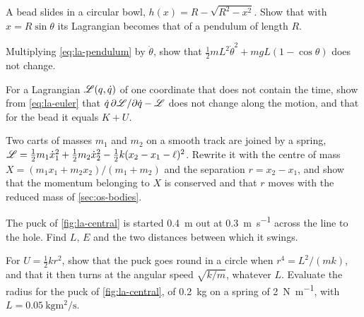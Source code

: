 \begin{exercise}
\label{ex:la-bowl}
A bead slides in a circular bowl, $h(x) = R - \sqrt{R^2 - x^2}$. Show
that with $x = R\sin\theta$ its Lagrangian becomes that of a pendulum of
length $R$.
\end{exercise}

\begin{exercise}
\label{ex:la-energy}
Multiplying \cref{eq:la-pendulum} by $\dot\theta$, show that $\frac12
mL^2\dot\theta^2 + mgL(1 - \cos\theta)$ does not change.
\end{exercise}

\begin{exercise}
\label{ex:la-hamilton}
For a Lagrangian $\mathscr{L}(q, \dot{q})$ of one coordinate that does not
contain the time, show from \cref{eq:la-euler} that $\dot{q}\,\partial
\mathscr{L}/\partial\dot{q} - \mathscr{L}$ does not change along the motion, and that
for the bead it equals $K + U$.
\end{exercise}

\begin{exercise}
\label{ex:la-carts}
Two carts of masses $m_1$ and $m_2$ on a smooth track are joined by a
spring, $\mathscr{L} = \frac12 m_1\dot{x}_1^2 + \frac12 m_2\dot{x}_2^2 - \frac12
k(x_2 - x_1 - \ell)^2$. Rewrite it with the centre of mass $X = (m_1x_1 +
m_2x_2)/(m_1 + m_2)$ and the separation $r = x_2 - x_1$, and show that
the momentum belonging to $X$ is conserved and that $r$ moves with the
reduced mass of \cref{sec:os-bodies}.
\end{exercise}

\begin{exercise}
\label{ex:la-turning}
The puck of \cref{fig:la-central} is started \SI{0.4}{\metre} out at
\SI{0.3}{\metre\per\second} across the line to the hole. Find $L$, $E$
and the two distances between which it swings.
\end{exercise}

\begin{exercise}
\label{ex:la-circle}
For $U = \frac12 kr^2$, show that the puck goes round in a circle when
$r^4 = L^2/(mk)$, and that it then turns at the angular speed
$\sqrt{k/m}$, whatever $L$. Evaluate the radius for the puck of
\cref{fig:la-central}, of \SI{0.2}{\kilogram} on a spring of
\SI{2}{\newton\per\metre}, with $L = \SI{0.05}{\kilogram\metre\squared\per
\second}$.
\end{exercise}

